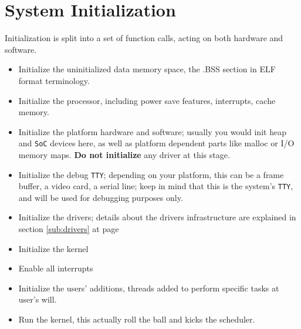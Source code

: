 \documentclass[11pt,b5paper]{scrbook}
\begin{document}
\section{System Initialization}
Initialization is split into a set of function calls, acting on both hardware and
software.

\hfill
\begin{tcolorbox}[enhanced, colframe=YellowGreen!80!White, leftrule=3mm, top=5mm, bottom=5mm, halign=center, drop fuzzy shadow]
\begin{itemize}
\item Initialize the uninitialized data memory space, the .BSS section in
ELF format terminology.
\item Initialize the processor, including power save features, interrupts,
cache memory.
\item Initialize the platform hardware and software; usually you would init
heap and \texttt{SoC} devices here, as well as platform dependent parts 
 like malloc or I/O memory maps.
\textbf{Do not initialize} any driver at this stage.
\item Initialize the debug \texttt{TTY}; depending on your platform, this can be a frame buffer,
a video card, a serial line; keep in mind that this is the system's \texttt{TTY}, and will be used
for debugging purposes only.
\item Initialize the drivers; details about the drivers infrastructure are
explained in section \ref{sub:drivers} at page \pageref{sub:drivers}
\item Initialize the kernel
\item Enable all interrupts
\item Initialize the users' additions, threads added to perform specific tasks
at user's will.
\item Run the kernel, this actually roll the ball and kicks the scheduler.
\end{itemize}
\end{tcolorbox}
\end{document}
